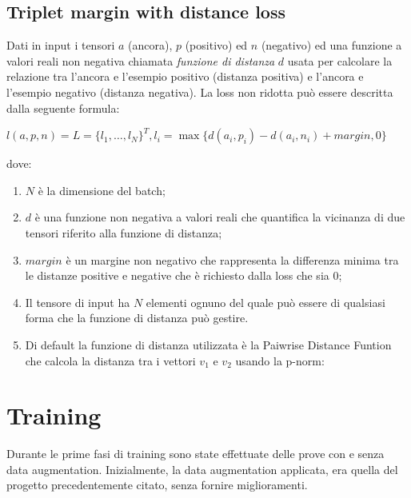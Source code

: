 \documentclass[11pt]{article}
\begin{document}
\subsection{Triplet margin with distance loss}
Dati in input i tensori $a$ (ancora), $p$ (positivo) ed $n$ (negativo) ed una funzione a valori
reali non negativa chiamata \textit{funzione di distanza} $d$ usata per calcolare la relazione tra
l'ancora e l'esempio positivo (distanza positiva) e l'ancora e l'esempio negativo (distanza negativa). La loss non ridotta può essere descritta dalla seguente formula:

\begin{center}
    $l(a,p,n) = L = { \{ l_1, \ldots, l_N \}}^T, l_i = \max{\{ d(a_i, p_i) - d(a_i, n_i) + margin, 0 \}} $
\end{center}

dove:

\begin{enumerate}
    \item $N$ è la dimensione del batch;
    \item {$d$ è una funzione non negativa a valori reali che quantifica la vicinanza di due tensori riferito
    alla funzione di distanza;}
    \item {$margin$ 
        è un margine non negativo che rappresenta la differenza minima
        tra le distanze positive e negative che è richiesto dalla loss che sia 0;
    }
    \item Il tensore di input ha $N$ elementi ognuno del quale può essere di qualsiasi forma che la funzione di distanza può gestire.

    \item {
        Di default la funzione di distanza utilizzata è la Paiwrise Distance Funtion
        che calcola la distanza tra i vettori $v_1$ e $v_2$ usando la p-norm:
    }

\end{enumerate}


\pagebreak
\section{Training}

Durante le prime fasi di training sono state effettuate delle prove con e senza data augmentation. Inizialmente, la data augmentation applicata,
era quella del progetto precedentemente citato, senza fornire miglioramenti.
\end{document}

